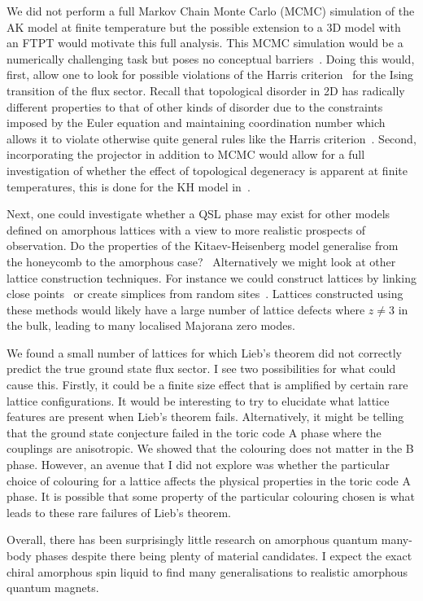 We did not perform a full Markov Chain Monte Carlo (MCMC) simulation of the AK model at finite temperature but the possible extension to a 3D model with an FTPT would motivate this full analysis. This MCMC simulation would be a numerically challenging task but poses no conceptual barriers~\autocite{Laumann2012,lahtinenTopologicalLiquidNucleation2012,selfThermallyInducedMetallic2019}. Doing this would, first, allow one to look for possible violations of the Harris criterion~\autocite{harrisEffectRandomDefects1974} for the Ising transition of the flux sector. Recall that topological disorder in 2D has radically different properties to that of other kinds of disorder due to the constraints imposed by the Euler equation and maintaining coordination number which allows it to violate otherwise quite general rules like the Harris criterion~\autocite{barghathiPhaseTransitionsRandom2014,schrauthViolationHarrisBarghathiVojtaCriterion2018}. Second, incorporating the projector in addition to MCMC would allow for a full investigation of whether the effect of topological degeneracy is apparent at finite temperatures, this is done for the KH model in~\autocite{selfThermallyInducedMetallic2019}.

Next, one could investigate whether a QSL phase may exist for other models defined on amorphous lattices with a view to more realistic prospects of observation. Do the properties of the Kitaev-Heisenberg model generalise from the honeycomb to the amorphous case?~\autocite{Chaloupka2010,Chaloupka2015,Jackeli2009,Kalmeyer1989,manousakis1991} Alternatively we might look at other lattice construction techniques. For instance we could construct lattices by linking close points~\autocite{agarwala2019topological} or create simplices from random sites~\autocite{christRandomLatticeField1982}. Lattices constructed using these methods would likely have a large number of lattice defects where \(z \neq 3\) in the bulk, leading to many localised Majorana zero modes.

We found a small number of lattices for which Lieb's theorem did not correctly predict the true ground state flux sector. I see two possibilities for what could cause this. Firstly, it could be a finite size effect that is amplified by certain rare lattice configurations. It would be interesting to try to elucidate what lattice features are present when Lieb's theorem fails. Alternatively, it might be telling that the ground state conjecture failed in the toric code A phase where the couplings are anisotropic. We showed that the colouring does not matter in the B phase. However, an avenue that I did not explore was whether the particular choice of colouring for a lattice affects the physical properties in the toric code A phase. It is possible that some property of the particular colouring chosen is what leads to these rare failures of Lieb's theorem.

Overall, there has been surprisingly little research on amorphous quantum many-body phases despite there being plenty of material candidates. I expect the exact chiral amorphous spin liquid to find many generalisations to realistic amorphous quantum magnets.
